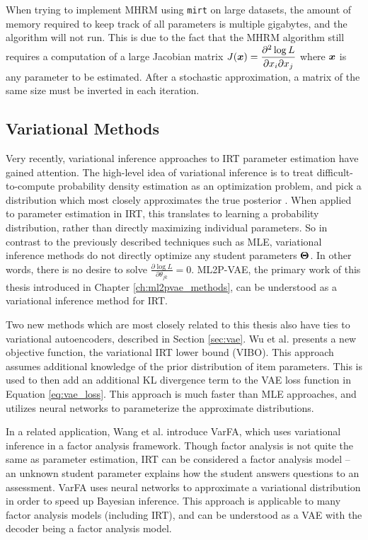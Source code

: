 When trying to implement MHRM using \verb!mirt! on large datasets, the amount of memory required to keep track of all parameters is multiple gigabytes, and the algorithm will not run. This is due to the fact that the MHRM algorithm still requires a computation of a large Jacobian matrix $J(\boldsymbol{x}) = \displaystyle\frac{\partial^2 \log L}{\partial x_i \partial x_j}$ where $\boldsymbol{x}$ is any parameter to be estimated. After a stochastic approximation, a matrix of the same size must be inverted in each iteration. 

\subsection{Variational Methods}
Very recently, variational inference approaches to IRT parameter estimation have gained attention. The high-level idea of variational inference is to treat difficult-to-compute probability density estimation as an optimization problem, and pick a distribution which most closely approximates the true posterior \cite{Blei2017}. When applied to parameter estimation in IRT, this translates to learning a probability distribution, rather than directly maximizing individual parameters. So in contrast to the previously described techniques such as MLE, variational inference methods do not directly optimize any student parameters $\boldsymbol{\Theta}$. In other words, there is no desire to solve $\displaystyle\frac{\partial \log L}{\partial \theta_{jk}} = 0$. ML2P-VAE, the primary work of this thesis introduced in Chapter \ref{ch:ml2pvae_methods}, can be understood as a variational inference method for IRT.

Two new methods which are most closely related to this thesis also have ties to variational autoencoders, described in Section \ref{sec:vae}. Wu et al. \cite{wu2020} presents a new objective function, the variational IRT lower bound (VIBO). This approach assumes additional knowledge of the prior distribution of item parameters. This is used to then add an additional KL divergence term to the VAE loss function in Equation \ref{eq:vae_loss}. This approach is much faster than MLE approaches, and utilizes neural networks to parameterize the approximate distributions.

In a related application, Wang et al. \cite{wang2020} introduce VarFA, which uses variational inference in a factor analysis framework. Though factor analysis is not quite the same as parameter estimation, IRT can be considered a factor analysis model -- an unknown student parameter explains how the student answers questions to an assessment. VarFA uses neural networks to approximate a variational distribution in order to speed up Bayesian inference. This approach is applicable to many factor analysis models (including IRT), and can be understood as a VAE with the decoder being a factor analysis model.



